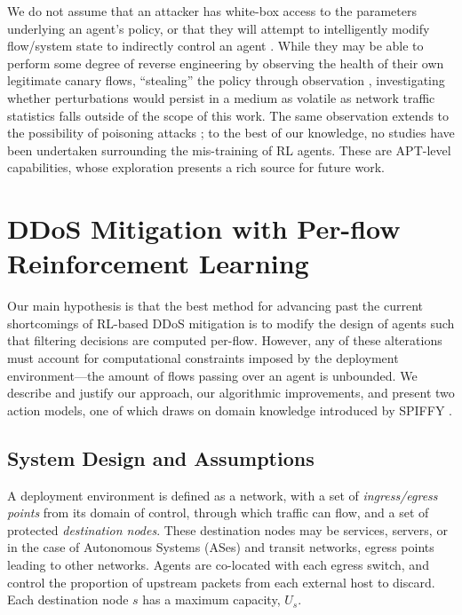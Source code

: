 \documentclass[10pt, times, comsoc]{IEEEtran}
\begin{document}
We do not assume that an attacker has white-box access to the parameters underlying an agent's policy, or that they will attempt to intelligently modify flow/system state to indirectly control an agent \cite{DBLP:conf/eurosp/PapernotMJFCS16, DBLP:conf/eurosp/PapernotMSW18, DBLP:journals/corr/HuangPGDA17, DBLP:conf/sp/Carlini017}.
While they may be able to perform some degree of reverse engineering by observing the health of their own legitimate canary flows, ``stealing'' the policy through observation \cite{DBLP:conf/uss/TramerZJRR16}, investigating whether perturbations would persist in a medium as volatile as network traffic statistics falls outside of the scope of this work.
The same observation extends to the possibility of poisoning attacks \cite{DBLP:journals/jmlr/KloftL10, DBLP:conf/acsac/ShenTS16}; to the best of our knowledge, no studies have been undertaken surrounding the mis-training of RL agents.
These are APT-level capabilities, whose exploration presents a rich source for future work.

\section{DDoS Mitigation with Per-flow Reinforcement Learning}\label{sec:ddos-mitigation-with-per-flow-reinforcement-learning}
Our main hypothesis is that the best method for advancing past the current shortcomings of RL-based DDoS mitigation is to modify the design of agents such that filtering decisions are computed per-flow.
However, any of these alterations must account for computational constraints imposed by the deployment environment---the amount of flows passing over an agent is unbounded.
We describe and justify our approach, our algorithmic improvements, and present two action models, one of which draws on domain knowledge introduced by SPIFFY \cite{DBLP:conf/ndss/KangGS16}.

\subsection{System Design and Assumptions}
A deployment environment is defined as a network, with a set of \emph{ingress/egress points} from its domain of control, through which traffic can flow, and a set of protected \emph{destination nodes}.
These destination nodes may be services, servers, or in the case of Autonomous Systems (ASes) and transit networks, egress points leading to other networks.
Agents are co-located with each egress switch, and control the proportion of upstream packets from each external host to discard.
Each destination node $s$ has a maximum capacity, $U_s$.
\end{document}
